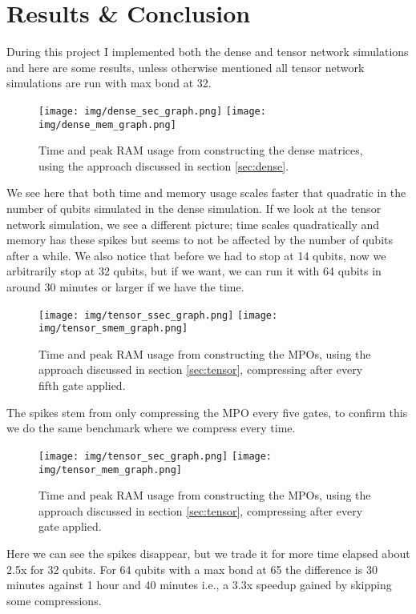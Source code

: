 \section{Results \& Conclusion}\label{sec:results}
During this project I implemented both the dense and tensor network simulations and here are some results, unless otherwise mentioned all tensor network simulations are run with max bond at 32. 
\begin{figure}[H]
    \begin{center}
        \texttt{[image: img/dense\_sec\_graph.png]}
        \texttt{[image: img/dense\_mem\_graph.png]}
    \end{center}
    \caption{Time and peak RAM usage from constructing the dense matrices, using the approach discussed in section \ref{sec:dense}.}
    \label{fig:dense_perf}
\end{figure}
\noindent
We see here that both time and memory usage scales faster that quadratic in the number of qubits simulated in the dense simulation. If we look at the tensor network simulation, we see a different picture; time scales quadratically and memory has these spikes but seems to not be affected by the number of qubits after a while. We also notice that before we had to stop at 14 qubits, now we arbitrarily stop at 32 qubits, but if we want, we can run it with 64 qubits in around 30 minutes or larger if we have the time. 
\begin{figure}[H]
    \begin{center}
        \texttt{[image: img/tensor\_ssec\_graph.png]}
        \texttt{[image: img/tensor\_smem\_graph.png]}
    \end{center}
    \caption{Time and peak RAM usage from constructing the MPOs, using the approach discussed in section \ref{sec:tensor}, compressing after every fifth gate applied.}
    \label{fig:stensor_perf}
\end{figure}
\noindent
The spikes stem from only compressing the MPO every five gates, to confirm this we do the same benchmark where we compress every time. 
\begin{figure}[H]
    \begin{center}
        \texttt{[image: img/tensor\_sec\_graph.png]}
        \texttt{[image: img/tensor\_mem\_graph.png]}
    \end{center}
    \caption{Time and peak RAM usage from constructing the MPOs, using the approach discussed in section \ref{sec:tensor}, compressing after every gate applied.}
    \label{fig:tensor_perf}
\end{figure}
\noindent
Here we can see the spikes disappear, but we trade it for more time elapsed about 2.5x for 32 qubits. For 64 qubits with a max bond at 65 the difference is 30 minutes against 1 hour and 40 minutes i.e., a 3.3x speedup gained by skipping some compressions. 

